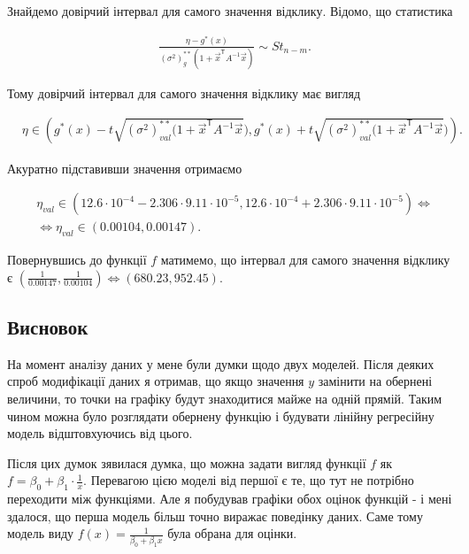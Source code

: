 \documentclass[14pt,a4paper]{scrartcl}
\theoremstyle{definition}
\theoremstyle{remark}
\theoremstyle{definition}
\theoremstyle{definition}
\begin{document}
Знайдемо довірчий інтервал для самого значення відклику. Відомо, що статистика

\begin{align*}
  & \frac{\eta - g^{*}(x)}{(\sigma^2)_{g}^{**} (1 + \vec{x}^\mathsf{T} A^{-1} \vec{x})} \sim St_{n - m}.
\end{align*}

Тому довірчий інтервал для самого значення відклику має вигляд

\begin{align*}
  & \eta \in \left( g^{*}(x) - t\sqrt{(\sigma^2)^{**}_{val} (1 + \vec{x}^\mathsf{T} A^{-1} \vec{x}}), g^{*}(x) + t\sqrt{(\sigma^2)^{**}_{val} (1 + \vec{x}^\mathsf{T} A^{-1} \vec{x}})  \right).
\end{align*}

Акуратно підставивши значення отримаємо

\begin{align*}
  & \eta_{val} \in \left( 12.6\cdot 10^{-4} - 2.306 \cdot 9.11\cdot 10^{-5}, 12.6\cdot 10^{-4} + 2.306 \cdot 9.11\cdot 10^{-5}  \right) \Leftrightarrow \\ & \Leftrightarrow \eta_{val} \in \left( 0.00104, 0.00147  \right).
\end{align*}

Повернувшись до функції $f$ матимемо, що інтервал для самого значення відклику є $(\frac{1}{0.00147}, \frac{1}{0.00104}) \Leftrightarrow (680.23, 952.45)$.

\subsection{Висновок}

На момент аналізу даних у мене були думки щодо двух моделей. Після деяких спроб модифікації даних я отримав, що якщо значення $y$ замінити на обернені величини, то точки на графіку будут знаходитися майже на одній прямій. Таким чином можна було розглядати обернену функцію і будувати лінійну регресійну модель відштовхуючись від цього.

Після цих думок з\textquotesingle явилася думка, що можна задати вигляд функції $f$ як $f = \beta_{0} + \beta_{1} \cdot \frac{1}{x}$. Перевагою цією моделі від першої є те, що тут не потрібно переходити між функціями. Але я побудував графіки обох оцінок функцій - і мені здалося, що перша модель більш точно виражає поведінку даних. Саме тому модель виду $f(x) = \frac{1}{\beta_{0} + \beta_{1} x}$ була обрана для оцінки.

\newpage
\end{document}
